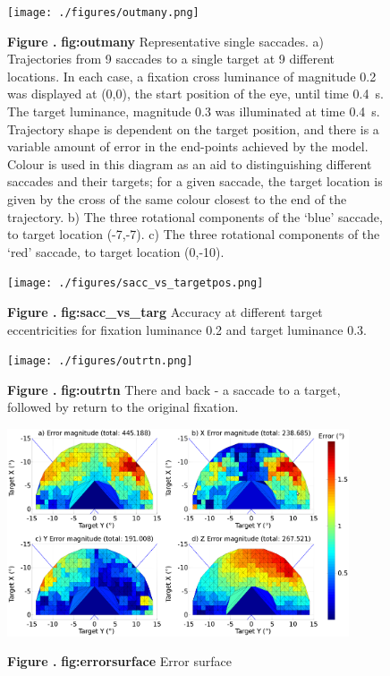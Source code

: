 \documentclass{frontiersSCNS}
\begin{document}
\begin{figure}[htb!]
\begin{center}
\texttt{[image: ./figures/outmany.png]}
\end{center}
\textbf{\label{fig:outmany} Figure .}
{ \textbf{fig:outmany} Representative single saccades. a) Trajectories
from 9 saccades to a single target at 9 different locations. In each
case, a fixation cross luminance of magnitude 0.2 was displayed at
(0,0), the start position of the eye, until time 0.4~s. The target
luminance, magnitude 0.3 was illuminated at time 0.4~s. Trajectory
shape is dependent on the target position, and there is a variable
amount of error in the end-points achieved by the model. Colour is
used in this diagram as an aid to distinguishing different saccades
and their targets; for a given saccade, the target location is given
by the cross of the same colour closest to the end of the
trajectory. b) The three rotational components of the `blue' saccade,
to target location (-7,-7). c) The three rotational components of the
`red' saccade, to target location (0,-10).}
\end{figure}

\begin{figure}[htb!]
\begin{center}
\texttt{[image: ./figures/sacc\_vs\_targetpos.png]}
\end{center}
\textbf{\label{fig:sacc_vs_targ} Figure .}
{ \textbf{fig:sacc\_vs\_targ} Accuracy at different target eccentricities for fixation luminance 0.2 and target luminance 0.3.}
\end{figure}


\begin{figure}[htb!]
\begin{center}
\texttt{[image: ./figures/outrtn.png]}
\end{center}
\textbf{\label{fig:outrtn} Figure .}
{ \textbf{fig:outrtn} There and back - a saccade to a target, followed by return to the original fixation.}
\end{figure}

\begin{figure}[htb!]
\begin{center}
\includegraphics[width=0.9\textwidth]{./figures/errorsurface.png}
\end{center}
\textbf{\label{fig:errorsurface} Figure .}
{ \textbf{fig:errorsurface} Error surface}
\end{figure}
\end{document}

